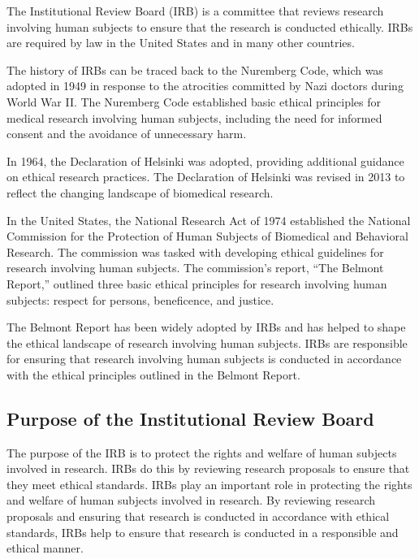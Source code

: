 \documentclass[
  b5paper]{book}
\begin{document}
The Institutional Review Board (IRB) is a committee that reviews research involving human subjects to ensure that the research is conducted ethically. IRBs are required by law in the United States and in many other countries.

The history of IRBs can be traced back to the Nuremberg Code, which was adopted in 1949 in response to the atrocities committed by Nazi doctors during World War II. The Nuremberg Code established basic ethical principles for medical research involving human subjects, including the need for informed consent and the avoidance of unnecessary harm.

In 1964, the Declaration of Helsinki was adopted, providing additional guidance on ethical research practices. The Declaration of Helsinki was revised in 2013 to reflect the changing landscape of biomedical research.

In the United States, the National Research Act of 1974 established the National Commission for the Protection of Human Subjects of Biomedical and Behavioral Research. The commission was tasked with developing ethical guidelines for research involving human subjects. The commission's report, ``The Belmont Report,'' outlined three basic ethical principles for research involving human subjects: respect for persons, beneficence, and justice.

The Belmont Report has been widely adopted by IRBs and has helped to shape the ethical landscape of research involving human subjects. IRBs are responsible for ensuring that research involving human subjects is conducted in accordance with the ethical principles outlined in the Belmont Report.

\hypertarget{purpose-of-the-institutional-review-board}{%
\subsection*{Purpose of the Institutional Review Board}\label{purpose-of-the-institutional-review-board}}

The purpose of the IRB is to protect the rights and welfare of human subjects involved in research. IRBs do this by reviewing research proposals to ensure that they meet ethical standards. IRBs play an important role in protecting the rights and welfare of human subjects involved in research. By reviewing research proposals and ensuring that research is conducted in accordance with ethical standards, IRBs help to ensure that research is conducted in a responsible and ethical manner.
\end{document}
